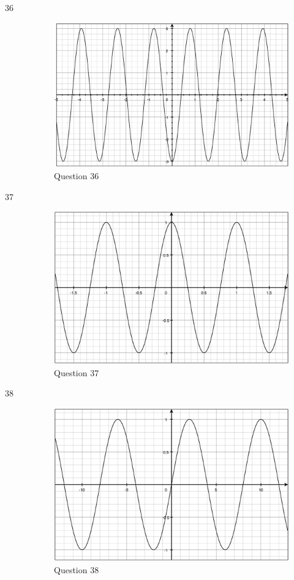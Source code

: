 \documentclass[fleqn,addpoints]{exam}
\begin{document}
\begin{description}
\item[36]
\begin{figure}[H]
  \centering
  \includegraphics[scale=.3]{question36.eps}
  \caption*{Question 36}
\end{figure}

\item[37]
\begin{figure}[H]
  \centering
  \includegraphics[scale=.3]{question37.eps}
  \caption*{Question 37}
\end{figure}

\item[38]
\begin{figure}[H]
  \centering
  \includegraphics[scale=.3]{question38.eps}
  \caption*{Question 38}
\end{figure}


\end{description}
\end{document}
